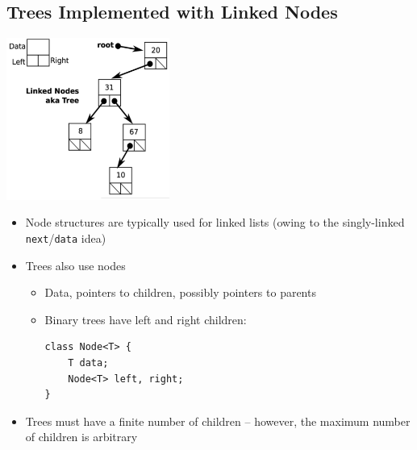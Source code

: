 \documentclass[10pt]{article}
\begin{document}
\subsection*{Trees Implemented with Linked Nodes}
\begin{center}
    \includegraphics[width = 0.4\textwidth]{images/img00010}
\end{center}
\begin{itemize}
    \item Node structures are typically used for linked lists (owing to the singly-linked \texttt{next}/\texttt{data} idea)
    \item Trees also use nodes
    \begin{itemize}
        \item Data, pointers to children, possibly pointers to parents
        \item Binary trees have left and right children:
        \begin{verbatim}
class Node<T> {
    T data;
    Node<T> left, right;
}
        \end{verbatim}
    \end{itemize}
    \item Trees must have a finite number of children -- however, the maximum number of children is arbitrary
\end{itemize}
\end{document}
